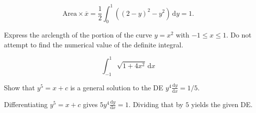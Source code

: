 \documentclass[12pt,fleqn,answers]{exam}
\begin{document}
\begin{questions}
\begin{parts}
\begin{solution}[2.5in]
  \begin{equation}
    \mbox{Area} \times  \overline{x} =  \frac{1}{2} \int_0^1 \left( (2-y)^2 - y^2 \right) \, \mathrm{d} y
    = 1.
   \end{equation}
\end{solution}
\end{parts}

\question[5] Express the arclength of the portion of the curve $y = x^2$ 
with $-1 \leq x \leq 1$. Do not
attempt to find the numerical value of the definite integral.
\begin{solution}[2.5in]
\[ \int_{-1}^1 \sqrt{1 + 4 x^2} \, \mathrm{d} x\]
\end{solution}


\question [5] Show that $y^5=x+ c$ is a general solution to the DE $y^4  \frac{\mathrm{d} y}{\mathrm{d} x}  = 1/5$.

\begin{solution} Differentiating $y^5=x+ c$ gives 
  $5 y^4 \frac{\mathrm{d} y}{\mathrm{d} x} = 1$. Dividing that by
  $5$ yields the given DE.

\end{solution}
\end{questions}
%     
\end{document}
